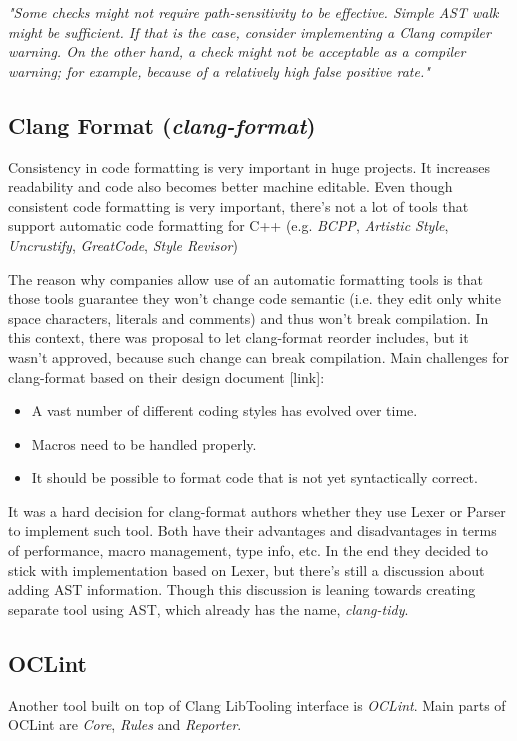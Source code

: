 \label{clang-analyzer-checkers}
\emph{"Some checks might not require path-sensitivity to be effective. Simple AST walk might be sufficient. If that is the case, consider implementing a Clang compiler warning. On the other hand, a check might not be acceptable as a compiler warning; for example, because of a relatively high false positive rate."}

\subsection{Clang Format (\emph{clang-format})}
\label{clang-format}
Consistency in code formatting is very important in huge projects. It increases readability and code also becomes better machine editable. Even though consistent code formatting is very important, there's not a lot of tools that support automatic code formatting for C++ (e.g. \textit{BCPP}, \textit{Artistic Style}, \textit{Uncrustify}, \textit{GreatCode}, \emph{Style Revisor})

The reason why companies allow use of an automatic formatting tools is that those tools guarantee they won't change code semantic (i.e. they edit only white space characters, literals and comments) and thus won't break compilation. In this context, there was proposal to let clang-format reorder includes, but it wasn't approved, because such change can break compilation. Main challenges for clang-format based on their design document [link]:

\begin{itemize}
\item A vast number of different coding styles has evolved over time.
\item Macros need to be handled properly.
\item It should be possible to format code that is not yet syntactically correct.
\end{itemize}

It was a hard decision for clang-format authors whether they use Lexer or Parser to implement such tool. Both have their advantages and disadvantages in terms of performance, macro management, type info, etc. In the end they decided to stick with implementation based on Lexer, but there's still a discussion about adding AST information. Though this discussion is leaning towards creating separate tool using AST, which already has the name, \emph{clang-tidy}.

\subsection{OCLint}
Another tool built on top of Clang LibTooling interface is \emph{OCLint}. Main parts of OCLint are \emph{Core}, \emph{Rules} and \emph{Reporter}.

